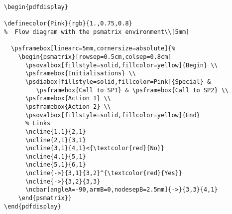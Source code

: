 \documentclass{ltxguide}
\begin{document}
\begin{pdfdisplay}


\end{pdfdisplay}

\begin{verbatim}
\begin{pdfdisplay}

\definecolor{Pink}{rgb}{1.,0.75,0.8}
%  Flow diagram with the psmatrix environment\\[5mm]

  \psframebox[linearc=5mm,cornersize=absolute]{%
    \begin{psmatrix}[rowsep=0.5cm,colsep=0.8cm]
      \psovalbox[fillstyle=solid,fillcolor=yellow]{Begin} \\
      \psframebox{Initialisations} \\
      \psdiabox[fillstyle=solid,fillcolor=Pink]{Special} &
         \psframebox{Call to SP1} & \psframebox{Call to SP2} \\
      \psframebox{Action 1} \\
      \psframebox{Action 2} \\
      \psovalbox[fillstyle=solid,fillcolor=yellow]{End}
      % Links
      \ncline{1,1}{2,1}
      \ncline{2,1}{3,1}
      \ncline{3,1}{4,1}<{\textcolor{red}{No}}
      \ncline{4,1}{5,1}
      \ncline{5,1}{6,1}
      \ncline{->}{3,1}{3,2}^{\textcolor{red}{Yes}}
      \ncline{->}{3,2}{3,3}
      \ncbar[angleA=-90,armB=0,nodesepB=2.5mm]{->}{3,3}{4,1}
    \end{psmatrix}}
\end{pdfdisplay}
\end{verbatim}
  
\end{document}
